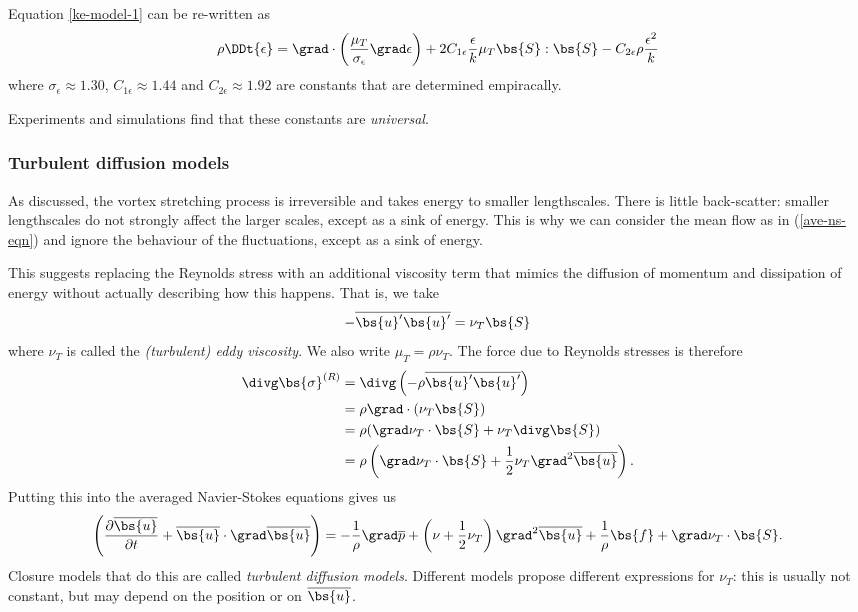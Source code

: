 Equation \ref{ke-model-1} can be re-written as 
\begin{equation}
    \rho\DDt{\epsilon} =
    \grad\cdot\left(\frac{\mu_T}{\sigma_\epsilon}\grad\epsilon\right)
    + 2 C_{1\epsilon} \frac{\epsilon}{k}\mu_T\bs{S}:\bs{S}
    - C_{2\epsilon}\rho\frac{\epsilon^2}{k}
\end{equation}
where $\sigma_\epsilon\approx1.30$, $C_{1\epsilon}\approx1.44$ and
$C_{2\epsilon}\approx1.92$ are constants that are determined empiracally.

Experiments and simulations find that these constants are \textit{universal}.

\subsubsection{Turbulent diffusion models}

As discussed, the vortex stretching process is irreversible and takes energy to
smaller lengthscales. There is little back-scatter: smaller lengthscales do not
strongly affect the larger scales, except as a sink of energy. This is why we
can consider the mean flow as in (\ref{ave-ns-eqn}) and ignore the behaviour of
the fluctuations, except as a sink of energy.

This suggests replacing the Reynolds stress with an additional viscosity term
that mimics the diffusion of momentum and dissipation of energy without actually
describing how this happens. That is, we take
\begin{equation}
    -\overline{\bs{u}' \bs{u}'} = \nu_T \bs{S}
\end{equation}
where $\nu_T$ is called the \textit{(turbulent) eddy viscosity}. We also write
$\mu_T = \rho\nu_T$. The force due to Reynolds stresses is therefore
\begin{align}
    \divg\bs{\sigma}^{(R)} &= \divg\left(-\rho\overline{\bs{u}'\bs{u}'}\right)  \\
     &= \rho\grad\cdot(\nu_T\bs{S}) \\
     &= \rho (\grad\nu_T \cdot \bs{S} + \nu_T \divg\bs{S}) \\
     &= \rho \left(\grad\nu_T \cdot \bs{S} + \frac{1}{2} \nu_T \grad^2\overline{\bs{u}}\right).
\end{align}
Putting this into the averaged Navier-Stokes equations gives us
\begin{equation}
    \left(\frac{\partial\overline{\bs{u}}}{\partial t} +
    \overline{\bs{u}}\cdot\grad\overline{\bs{u}}\right)
    = -\frac{1}{\rho}\grad\overline{p} 
    + \left(\nu+\frac{1}{2}\nu_T\right)\grad^2\overline{\bs{u}} 
    + \frac{1}{\rho}\bs{f} 
    + \grad\nu_T \cdot \bs{S}.
    \label{ave-ns-eqn-td-model}
\end{equation}
Closure models that do this are called \textit{turbulent diffusion models}.
Different models propose different expressions for $\nu_T$: this is usually not 
constant, but may depend on the position or on $\overline{\bs{u}}$.

